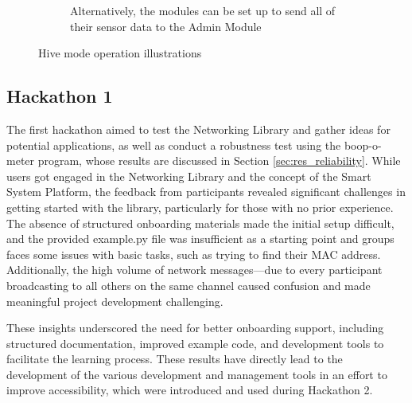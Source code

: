 \begin{figure}[H]
\begin{subfigure}{0.32\textwidth}
        \caption{Alternatively, the modules can be set up to send all of their sensor data to the Admin Module}
    \end{subfigure}
    \vspace{\ftspace}
    \caption{Hive mode operation illustrations}
    \vspace{\ftspace}
    \label{fig:hivemode}
\end{figure}

\subsection{\label{sec:res_hackathon1}Hackathon 1}

The first hackathon aimed to test the Networking Library and gather ideas for potential applications, as well as conduct a robustness test using the boop-o-meter program, whose results are discussed in Section \ref{sec:res_reliability}. While users got engaged in the Networking Library and the concept of the Smart System Platform, the feedback from participants revealed significant challenges in getting started with the library, particularly for those with no prior experience. The absence of structured onboarding materials made the initial setup difficult, and the provided example.py file was insufficient as a starting point and groups faces some issues with basic tasks, such as trying to find their MAC address. Additionally, the high volume of network messages—due to every participant broadcasting to all others on the same channel caused confusion and made meaningful project development challenging.

These insights underscored the need for better onboarding support, including structured documentation, improved example code, and development tools to facilitate the learning process. These results have directly lead to the development of the various development and management tools in an effort to improve accessibility, which were introduced and used during Hackathon 2.

